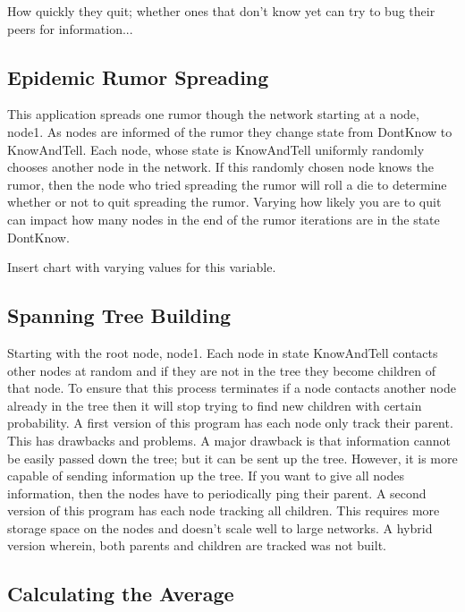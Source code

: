 \documentclass[11pt,twocolumn]{article}
\begin{document}
How quickly they quit; whether ones that don't know yet can try to bug their peers for information...

\subsection{Epidemic Rumor Spreading}

This application spreads one rumor though the network starting at a node, node1.  As nodes are informed of the rumor they change state from DontKnow to KnowAndTell.  Each node, whose state is KnowAndTell uniformly randomly chooses another node in the network.  If this randomly chosen node knows the rumor, then the node who tried spreading the rumor will roll a die to determine whether or not to quit spreading the rumor.  Varying how likely you are to quit can impact how many nodes in the end of the rumor iterations are in the state DontKnow.

Insert chart with varying values for this variable.

\subsection{Spanning Tree Building}

Starting with the root node, node1.  Each node in state KnowAndTell contacts other nodes at random and if they are not in the tree they become children of that node.  To ensure that this process terminates if a node contacts another node already in the tree then it will stop trying to find new children with certain probability.  A first version of this program has each node only track their parent.  This has drawbacks and problems.  A major drawback is that information cannot be easily passed down the tree; but it can be sent up the tree.  However, it is more capable of sending information up the tree.  If you want to give all nodes information, then the nodes have to periodically ping their parent.  A second version of this program has each node tracking all children.  This requires more storage space on the nodes and doesn't scale well to large networks.  A hybrid version wherein, both parents and children are tracked was not built.

\subsection{Calculating the Average}
\end{document}

